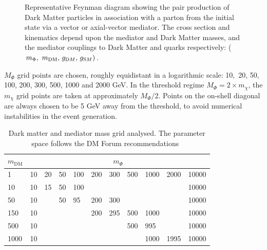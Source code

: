 \begin{figure}[h!]
  \centering
  \caption{Representative Feynman diagram showing the pair production of Dark Matter particles in association with a parton from the initial state via a vector or axial-vector mediator. The cross section and kinematics depend upon the mediator and Dark Matter masses, and the mediator couplings to Dark Matter and quarks respectively: ($m_{\Phi} ,\ m_\textrm{DM} ,\, g_{\textrm DM} ,\, g_{\textrm SM})$. \cite{Abercrombie:2015wmb}}
  \label{fig:feynman}
\end{figure}

$M_{\Phi}$ grid points are chosen, roughly equidistant in a logarithmic scale: 10,~20, 50, 100, 200, 300, 500, 1000 and 2000 GeV. In the  threshold regime $M_{\Phi} = 2 \times m_{\chi}$, the $ m_{\chi}$ grid points are taken at approximately $M_{\Phi}/2$. Points on the on-shell diagonal are always chosen to be
5 GeV away from the threshold, to avoid numerical instabilities in the event generation. 


\begin{table}[h!]
\centering
\begin{tabular}{l|llllllllll}\hline \hline
$m_\textrm{DM}$  & \multicolumn{10}{c}{$m_\Phi$}                                   \\ \hline
1    & 10 & 20 & 50 & 100 & 200 & 300 & 500 & 1000 & 2000 & 10000 \\
10   & 10 & 15 & 50 & 100 &     &     &     &      &      & 10000 \\
50   & 10 &    & 50 & 95  & 200 & 300 &     &      &      & 10000 \\
150  & 10 &    &    &     & 200 & 295 & 500 & 1000 &      & 10000 \\
500  & 10 &    &    &     &     &     & 500 & 995  &      & 10000 \\
1000 & 10 &    &    &     &     &     &     & 1000 & 1995 & 10000\\ \hline
\hline
\end{tabular}
\caption{Dark matter and mediator mass grid analysed. The parameter space follows the DM Forum recommendations~\cite{Abercrombie:2015wmb}}
\label{tab:DMgrid}
\end{table}

